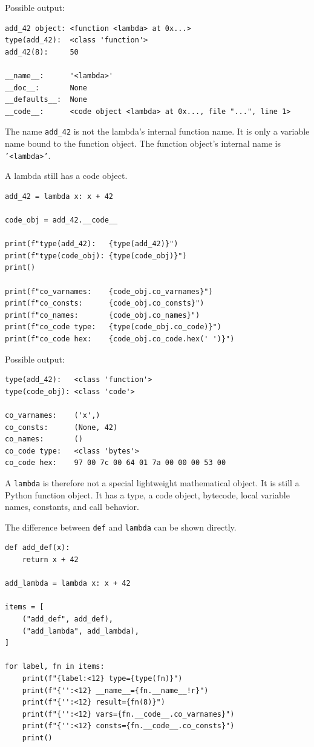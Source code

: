 Possible output:

\begin{verbatim}
add_42 object: <function <lambda> at 0x...>
type(add_42):  <class 'function'>
add_42(8):     50

__name__:      '<lambda>'
__doc__:       None
__defaults__:  None
__code__:      <code object <lambda> at 0x..., file "...", line 1>
\end{verbatim}

The name \texttt{add\_42} is not the lambda's internal function name. It is only a variable name bound to the function object. The function object's internal name is \texttt{'<lambda>'}.

A lambda still has a code object.

\begin{verbatim}
add_42 = lambda x: x + 42

code_obj = add_42.__code__

print(f"type(add_42):   {type(add_42)}")
print(f"type(code_obj): {type(code_obj)}")
print()

print(f"co_varnames:    {code_obj.co_varnames}")
print(f"co_consts:      {code_obj.co_consts}")
print(f"co_names:       {code_obj.co_names}")
print(f"co_code type:   {type(code_obj.co_code)}")
print(f"co_code hex:    {code_obj.co_code.hex(' ')}")
\end{verbatim}

Possible output:

\begin{verbatim}
type(add_42):   <class 'function'>
type(code_obj): <class 'code'>

co_varnames:    ('x',)
co_consts:      (None, 42)
co_names:       ()
co_code type:   <class 'bytes'>
co_code hex:    97 00 7c 00 64 01 7a 00 00 00 53 00
\end{verbatim}

A \texttt{lambda} is therefore not a special lightweight mathematical object. It is still a Python function object. It has a type, a code object, bytecode, local variable names, constants, and call behavior.

The difference between \texttt{def} and \texttt{lambda} can be shown directly.

\begin{verbatim}
def add_def(x):
    return x + 42

add_lambda = lambda x: x + 42

items = [
    ("add_def", add_def),
    ("add_lambda", add_lambda),
]

for label, fn in items:
    print(f"{label:<12} type={type(fn)}")
    print(f"{'':<12} __name__={fn.__name__!r}")
    print(f"{'':<12} result={fn(8)}")
    print(f"{'':<12} vars={fn.__code__.co_varnames}")
    print(f"{'':<12} consts={fn.__code__.co_consts}")
    print()
\end{verbatim}

